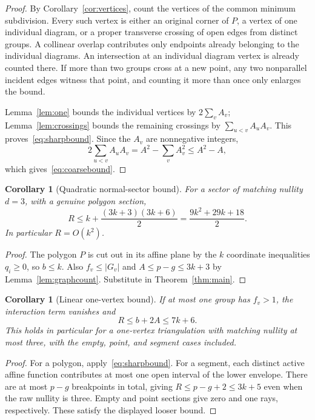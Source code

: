 \documentclass[11pt,letterpaper]{article}
\newtheorem{corollary}[theorem]{Corollary}
\theoremstyle{definition}
\theoremstyle{remark}\newtheorem{remark}[theorem]{Remark}
\begin{document}
\begin{proof}
By Corollary~\ref{cor:vertices}, count the vertices of the common minimum
subdivision. Every such vertex is either an original corner of $P$, a
vertex of one individual diagram, or a proper transverse crossing of open
edges from distinct groups. A collinear overlap contributes only endpoints
already belonging to the individual diagrams. An intersection at an
individual diagram vertex is already counted there. If more than two
groups cross at a new point, any two nonparallel incident edges witness
that point, and counting it more than once only enlarges the bound.

Lemma~\ref{lem:one} bounds the individual vertices by $2\sum_v A_v$;
Lemma~\ref{lem:crossings} bounds the remaining crossings by
$\sum_{u<v}A_uA_v$. This proves~\eqref{eq:sharpbound}. Since the $A_v$
are nonnegative integers,
\[
 2\sum_{u<v}A_uA_v=A^2-\sum_v A_v^2\le A^2-A,
\]
which gives~\eqref{eq:coarsebound}.
\end{proof}

\begin{corollary}[Quadratic normal-sector bound]
\label{cor:quadratic}
For a sector of matching nullity $d=3$, with a genuine polygon section,
\[
 R\le k+\frac{(3k+3)(3k+6)}2
       =\frac{9k^2+29k+18}{2}.
\]
In particular $R=O(k^2)$.
\end{corollary}

\begin{proof}
The polygon $P$ is cut out in its affine plane by the $k$ coordinate
inequalities $q_i\ge0$, so $b\le k$. Also $f_v\le|G_v|$ and
$A\le p-g\le3k+3$ by Lemma~\ref{lem:graphcount}. Substitute in
Theorem~\ref{thm:main}.
\end{proof}

\begin{corollary}[Linear one-vertex bound]
\label{cor:linear}
If at most one group has $f_v>1$, the interaction term vanishes and
\[
 R\le b+2A\le7k+6.
\]
This holds in particular for a one-vertex triangulation with matching
nullity at most three, with the empty, point, and segment cases included.
\end{corollary}

\begin{proof}
For a polygon, apply~\eqref{eq:sharpbound}. For a segment, each distinct
active affine function contributes at most one open interval of the lower
envelope. There are at most $p-g$ breakpoints in total, giving
$R\le p-g+2\le3k+5$ even when the raw nullity is three. Empty and
point sections give zero and one rays, respectively. These satisfy the
displayed looser bound.
\end{proof}
\end{document}
